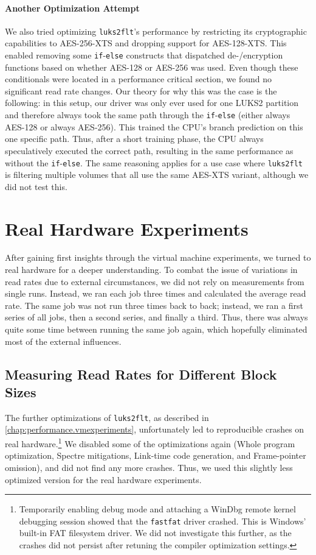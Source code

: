 \paragraph{Another Optimization Attempt}
We also tried optimizing \texttt{luks2flt}'s performance by restricting its cryptographic capabilities to AES-256-XTS and dropping support for AES-128-XTS. This enabled removing some \texttt{if}-\texttt{else} constructs that dispatched de-/encryption functions based on whether AES-128 or AES-256 was used. Even though these conditionals were located in a performance critical section, we found no significant read rate changes. Our theory for why this was the case is the following: in this setup, our driver was only ever used for one LUKS2 partition and therefore always took the same path through the \texttt{if}-\texttt{else} (either always AES-128 or always AES-256). This trained the CPU's branch prediction on this one specific path. Thus, after a short training phase, the CPU always speculatively executed the correct path, resulting in the same performance as without the \texttt{if}-\texttt{else}. The same reasoning applies for a use case where \texttt{luks2flt} is filtering multiple volumes that all use the same AES-XTS variant, although we did not test this.

\section{Real Hardware Experiments}
\label{chap:performance.hwexperiments}
After gaining first insights through the virtual machine experiments, we turned to real hardware for a deeper understanding. To combat the issue of variations in read rates due to external circumstances, we did not rely on measurements from single runs. Instead, we ran each job three times and calculated the average read rate. The same job was not run three times back to back; instead, we ran a first series of all jobs, then a second series, and finally a third. Thus, there was always quite some time between running the same job again, which hopefully eliminated most of the external influences.

\subsection{Measuring Read Rates for Different Block Sizes}
\label{chap:performance.hwexperiments.readrateoverblocksize}
The further optimizations of \texttt{luks2flt}, as described in \autoref{chap:performance.vmexperiments}, unfortunately led to reproducible crashes on real hardware.\footnote{\label{fn:performance.hwexperiments.fastfatcrash} Temporarily enabling debug mode and attaching a WinDbg remote kernel debugging session showed that the \texttt{fastfat} driver crashed. This is Windows' built-in FAT filesystem driver. We did not investigate this further, as the crashes did not persist after retuning the compiler optimization settings.} We disabled some of the optimizations again (Whole program optimization, Spectre mitigations, Link-time code generation, and Frame-pointer omission), and did not find any more crashes. Thus, we used this slightly less optimized version for the real hardware experiments.

